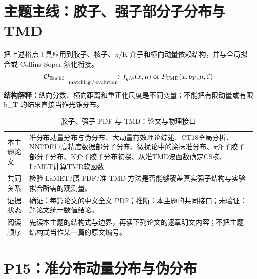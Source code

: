 \documentclass[UTF8,11pt,oneside]{ctexbook}
\begin{document}
\chapter*{主题主线：胶子、强子部分子分布与 TMD}
把上述格点工具应用到胶子、核子、$\pi$/K 介子和横向动量依赖结构，并与全局拟合或 Collins–Soper 演化衔接。
\begin{equation}
  \mathcal O_{\rm Euclid}\xrightarrow[\rm matching\,/\,evolution]{}f_{g/h}(x,\mu)\;{\rm or}\;F_{\rm TMD}(x,b_T,\mu,\zeta)
\end{equation}
\noindent\textbf{结构解释：}纵向分数、横向距离和重正化尺度是不同变量；不能把有限动量或有限 b\_T 的结果直接当作光锥分布。
\begin{table}[htbp]
  \centering
  \caption{胶子、强子 PDF 与 TMD：论文与物理接口}
  \small
  \begin{tabularx}{0.96\textwidth}{@{}p{3.3cm}>{\raggedright\arraybackslash}X@{}}
    \toprule
    本主题论文 & 准分布动量分布与伪分布、大动量有效理论综述、CT18全局分析、NNPDF17高精度数据部分子分布、微扰论中的涂抹准分布、$\pi$介子胶子部分子分布、K介子胶子分布初探、从准TMD波函数确定CS核、LaMET计算TMD软函数 \\
    共同关系 & 检验 LaMET/赝 PDF/准 TMD 方法是否能够覆盖真实强子结构与实验拟合所需的观测量。 \\
    证据状态 & 确证：每篇论文的中文全文 PDF；推断：本主题的共同接口；未验证：跨论文统一数值结论。 \\
    阅读顺序 & 先读本主题的结构式与边界，再读下列论文的逐章明文内容；不把主题结构式当作某一篇的原文编号。 \\
    \bottomrule
  \end{tabularx}
\end{table}

\chapter{P15：准分布动量分布与伪分布}
\end{document}
